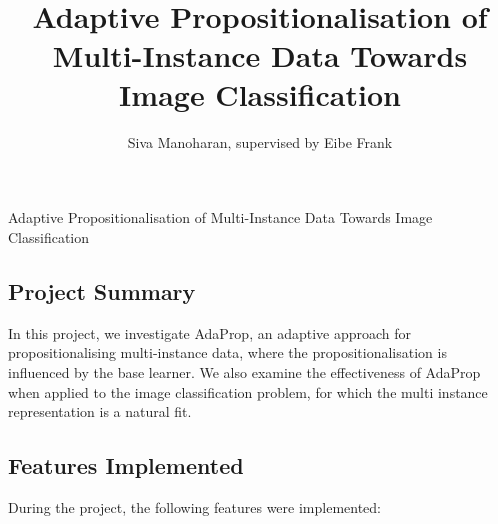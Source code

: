 \documentclass[a4paper,12pt]{article} %
\title{\ \\ \  \\ Adaptive Propositionalisation of Multi-Instance Data Towards Image Classification}
\author{Siva Manoharan, supervised by Eibe Frank}
\date{} %
\begin{document}
\onehalfspacing

{}

\begin{center}
\LARGE
Adaptive Propositionalisation of Multi-Instance Data Towards Image Classification
\end{center}


\subsection*{Project Summary}

In this project, 
    we investigate AdaProp, an
    adaptive approach for propositionalising
    multi-instance data, 
    where the propositionalisation 
    is influenced by 
    the base learner.
We also examine the effectiveness of 
    AdaProp when applied to the 
    image classification problem, 
    for which the multi instance representation
    is a natural fit.



\subsection*{Features Implemented}

During the project, 
    the following features were implemented:
\end{document}
